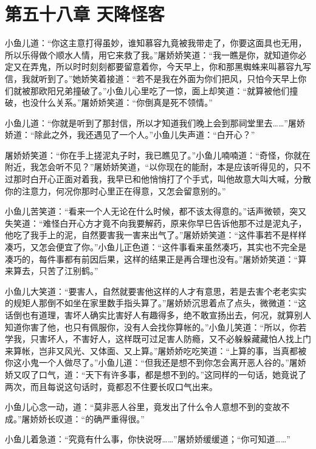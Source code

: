 \documentclass[12pt,oneside]{book}
\begin{document}
\hypertarget{ux7b2cux4e94ux5341ux516bux7ae0-ux5929ux964dux602aux5ba2}{%
\chapter{第五十八章
天降怪客}\label{ux7b2cux4e94ux5341ux516bux7ae0-ux5929ux964dux602aux5ba2}}

小鱼儿道：``你这主意打得虽妙，谁知慕容九竟被我带走了，你要这面具也无用，所以乐得做个顺水人情，用它来救了我。''屠娇娇笑道：``我一瞧是你，就知道你必定又在弄鬼，所以时时刻刻都要留意着你，今天早上，你和那黑蜘蛛来叫慕容九写信，我就听到了。''她娇笑着接道：``若不是我在外面为你们把风，只怕今天早上你们就被那欧阳兄弟撞破了。''小鱼儿心里吃了一惊，面上却笑道：``就算被他们撞破，也没什么关系。''屠娇娇笑道：``你倒真是死不领情。''

小鱼儿道：``你就是听到了那封信，所以才知道我们晚上会到那祠堂里去\ldots\ldots{}''屠娇娇道：``除此之外，我还遇见了一个人。''小鱼儿失声道：``白开心？''

屠娇娇笑道：``你在手上搓泥丸子时，我已瞧见了。''小鱼儿喃喃道：``奇怪，你就在附近，我怎会听不见？''屠娇娇笑道，``以你现在的能耐，本是应该听得见的，只不过那时白开心正面对着我，我早已和他悄悄打了个手式，叫他故意大叫大喊，分散你的注意力，何况你那时心里正在得意，又怎会留意别的。''

小鱼儿苦笑道：``看来一个人无论在什么时候，都不该太得意的。''话声微顿，突又失笑道：``难怪白开心方才竟不向我要解药，原来你早巳告诉他那不过是泥丸子，他吃了我手上的泥，自然要害我一害来出气了。''屠娇娇笑道：``这件事若不是样样凑巧，又怎会便宜了你。''小鱼儿正色道：``这件事看来虽然凑巧，其实也不完全是凑巧的，每件事都有前因后果，这样的结果正是再合理也没有。''屠娇娇笑道：``算来算去，只苦了江别鹤。''

小鱼儿大笑道：``要害人，自然就要害他这样的人才有意思，若是去害个老老实实的规矩人那倒不如坐在家里数手指头算了。''屠娇娇沉思着点了点头，微微道：``这话倒也有道理，害坏人确实比害好人有趣得多，绝不敢宣扬出去，何况，就算别人知道你害了他，也只有佩服你，没有人会找你算帐的。''小鱼儿笑道：``所以，你若学我，只害坏人，不害好人，这样既可过足害人防瘾，又不必躲躲藏藏怕人找上门来算帐，岂非又风光、又体面、又上算。''屠娇娇吃吃笑道：``上算的事，当真都被你这小鬼一个人做尽了。''小鱼儿道：``但我还是想不到你怎会离开恶人谷的。''屠娇娇又叹了口气，道：``天下有许多事，都是想不到的。''这同样的一句话，她竟说了两次，而且每说这句话时，竟都忍不住要长叹口气出来。

小鱼儿心念一动，道：``莫非恶人谷里，竟发出了什么令人意想不到的变故不成。''屠娇娇长叹道：``的确严重得很。''

小鱼儿着急道：``究竟有什么事，你快说呀\ldots\ldots{}''屠娇娇缓缓道；``你可知道\ldots\ldots{}''
\end{document}
